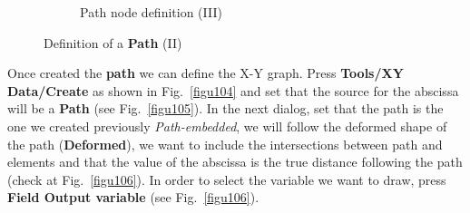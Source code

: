 \begin{enumerate}
\begin{figure}[H]
\begin{subfigure}{0.39\textwidth}
     \caption{Path node definition (III)}
     \label{figu103}
   \end{subfigure}%
   \caption{Definition of a \textbf{Path} (II)}
 \end{figure}

 Once created the \textbf {path} we can define the X-Y graph. Press
 \textbf{Tools/XY Data/Create} as shown in Fig.~\ref{figu104} and set
 that the source for the abscissa will be a \textbf{Path} (see
 Fig.~\ref{figu105}). In the next dialog, set that
 the path is the one we created previously \textit{Path-embedded},
  we will follow the deformed shape of the path
 (\textbf{Deformed}), we want to include the intersections between
 path and elements and that the value of the abscissa is the true
 distance following the path (check at Fig.~\ref{figu106}). In order
 to select the variable we want to draw, press \textbf{Field
   Output variable} (see Fig.~\ref{figu106}).


\end{enumerate}

